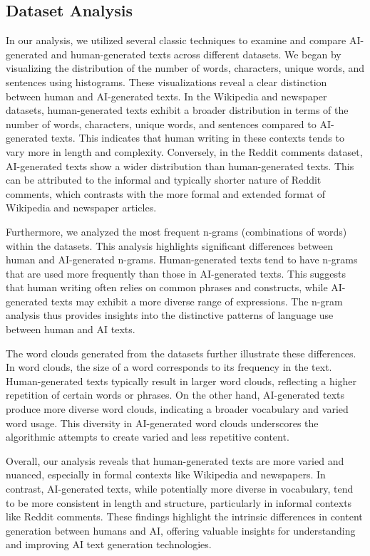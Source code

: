 \documentclass[11pt]{article}
\begin{document}
\subsection{Dataset Analysis}
In our analysis, we utilized several classic techniques to examine and compare AI-generated and human-generated texts across different datasets. We began by visualizing the distribution of the number of words, characters, unique words, and sentences using histograms. These visualizations reveal a clear distinction between human and AI-generated texts. In the Wikipedia and newspaper datasets, human-generated texts exhibit a broader distribution in terms of the number of words, characters, unique words, and sentences compared to AI-generated texts. This indicates that human writing in these contexts tends to vary more in length and complexity. Conversely, in the Reddit comments dataset, AI-generated texts show a wider distribution than human-generated texts. This can be attributed to the informal and typically shorter nature of Reddit comments, which contrasts with the more formal and extended format of Wikipedia and newspaper articles.

Furthermore, we analyzed the most frequent n-grams (combinations of words) within the datasets. This analysis highlights significant differences between human and AI-generated n-grams. Human-generated texts tend to have n-grams that are used more frequently than those in AI-generated texts. This suggests that human writing often relies on common phrases and constructs, while AI-generated texts may exhibit a more diverse range of expressions. The n-gram analysis thus provides insights into the distinctive patterns of language use between human and AI texts.

The word clouds generated from the datasets further illustrate these differences. In word clouds, the size of a word corresponds to its frequency in the text. Human-generated texts typically result in larger word clouds, reflecting a higher repetition of certain words or phrases. On the other hand, AI-generated texts produce more diverse word clouds, indicating a broader vocabulary and varied word usage. This diversity in AI-generated word clouds underscores the algorithmic attempts to create varied and less repetitive content.

Overall, our analysis reveals that human-generated texts are more varied and nuanced, especially in formal contexts like Wikipedia and newspapers. In contrast, AI-generated texts, while potentially more diverse in vocabulary, tend to be more consistent in length and structure, particularly in informal contexts like Reddit comments. These findings highlight the intrinsic differences in content generation between humans and AI, offering valuable insights for understanding and improving AI text generation technologies.
\end{document}
